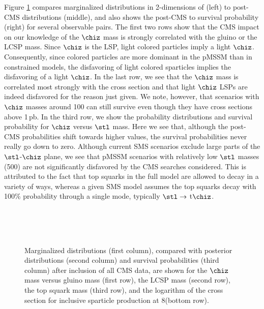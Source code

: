 Figure \ref{fig:twoD} compares marginalized distributions in 2-dimensions of \preCMS (left) to post-CMS distributions (middle), and also shows the post-CMS to \preCMS survival probability (right) for several observable pairs.  The first two rows show that the CMS impact on our knowledge of 
the $\chiz$ mass is strongly correlated with the gluino or the LCSP mass.  Since $\chiz$ is the LSP,  light colored particles imply a light $\chiz$.
Consequently, since colored particles are more dominant in the pMSSM than in constrained models, the disfavoring of light colored sparticles implies the disfavoring of a light $\chiz$.  In the last row, we see that the $\chiz$ mass is correlated most strongly with the cross section and that  light $\chiz$ LSPs are indeed disfavored for the reason just given.  
We note, however, that scenarios with $\chiz$ masses around 100\GeV
can still survive even though they have cross sections above 1\,pb.
In the third row, we show the probability distributions and survival
probability for $\chiz$ versus $\stl$ mass.  Here we see that, although the
post-CMS probabilities shift towards higher values, the survival
probabilities never really go down to zero.  Although current SMS
scenarios exclude large parts of the $\stl$-$\chiz$ plane, we see that
pMSSM scenarios with relatively low $\stl$ masses (500\GeV) are
not significantly disfavored by the CMS searches considered. This is attributed to the fact that top squarks in
the full model are allowed to decay in a variety of ways, whereas a given SMS model assumes the top squarks decay with 100\% probability through a single mode, typically $\stl\to$ t$\chiz$. 

\begin{figure}[p]
  \centering
  \\
  \\
    \\
\vspace{1mm}
  \caption{Marginalized \preCMS distributions (first column),
    compared with posterior distributions (second column)
    and survival probabilities (third column) after inclusion of all CMS data,
    are shown for the
    $\chiz$ mass versus gluino mass (first row), the LCSP mass
    (second row), the top squark mass (third row),  and the
    logarithm of the cross section for inclusive sparticle production at 8\TeV (bottom row).
  }
  \label{fig:twoD}
\end{figure}

